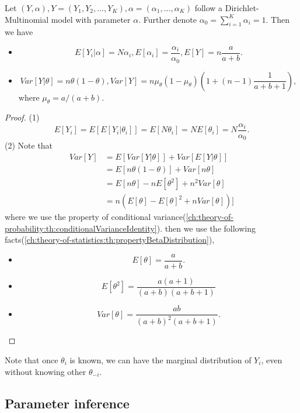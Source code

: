 \begin{refsection}
\begin{lemma}\label{ch:statistical-learning:th:BasicStatisticalPropertiesOfDirichletMultinomialModel}
	Let $(Y,\alpha),Y=(Y_1,Y_2,...,Y_K),\alpha=(\alpha_1,...,\alpha_K)$ follow a Dirichlet-Multinomial model with parameter $\alpha$. Further denote $\alpha_0=\sum_{i=1}^{K}\alpha_i=1$. Then we have
	\begin{itemize}
		\item $$E[Y_i|\alpha] = N\alpha_i, E[\alpha_i] = \frac{\alpha_i}{\alpha_0}, E[Y] = n\frac{a}{a+b}.$$
		\item $$Var[Y|\theta] = n\theta(1-\theta), Var[Y] = n\mu_{\theta}(1-\mu_\theta)(1 + (n-1)\frac{1}{a+b+1}),$$
		where $\mu_\theta = a/(a+b)$.
	\end{itemize}	
\end{lemma}
\begin{proof}
	(1) $$E[Y_i] = E[E[Y_i|\theta_i]] = E[N\theta_i] = NE[\theta_i] = N\frac{\alpha_i}{\alpha_0}.$$ 
	(2) Note that 
	\begin{align*}
	Var[Y] &= E[Var[Y|\theta]] + Var[E[Y|\theta]] \\
	&= E[n\theta(1-\theta)] + Var[n\theta] \\
	&= E[n\theta] - nE[\theta^2] + n^2 Var[\theta] \\
	&= n(E[\theta] - E[\theta]^2 + nVar[\theta]) ]
	\end{align*}
	where we use the property of conditional variance(\autoref{ch:theory-of-probability:th:conditionalVarianceIdentity}).
	then we use the following facts(\autoref{ch:theory-of-statistics:th:propertyBetaDistribution}),
	\begin{itemize}
		\item $$E[\theta] = \frac{a}{a+b}.$$
		\item $$E[\theta^2] = \frac{a(a+1)}{(a+b)(a+b+1)}$$
		\item $$Var[\theta] = \frac{ab}{(a+b)^2(a+b+1)}.$$
	\end{itemize}
\end{proof}

\begin{remark}
Note that once $\theta_i$ is known, we can have the marginal distribution of $Y_i$, even without knowing other $\theta_{-i}$.
\end{remark}


\subsection{Parameter inference}


\end{refsection}
